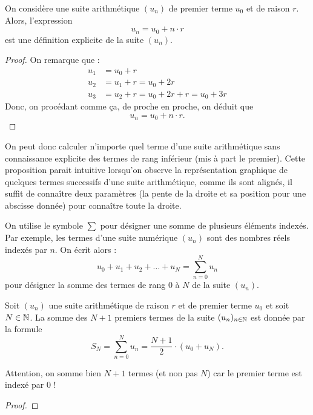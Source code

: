 \documentclass[frenchb]{report}
\begin{document}
\begin{prop}
On considère une suite arithmétique $(u_n)$ de premier terme $u_0$ et de raison $r$. Alors, l'expression 
\[ u_n = u_0 + n \cdot r \]
est une définition explicite de la suite $(u_n)$.
\end{prop}

\begin{proof}
On remarque que :
\begin{align*}
u_1 & = u_0 + r \\
u_2 & = u_1 + r = u_0 + 2r  \\
u_3 & = u_2 + r = u_0 + 2r + r = u_0 + 3r 
\end{align*}
Donc, on procédant comme ça, de proche en proche, on déduit que 
\[ u_n = u_0 + n \cdot r . \]
\end{proof}

\begin{rmq} On peut donc calculer n'importe quel terme d'une suite arithmétique sans connaissance explicite des termes de rang inférieur (mis à part le premier). Cette proposition parait intuitive lorsqu'on observe la représentation graphique de quelques termes successifs d'une suite arithmétique, comme ils sont alignés, il suffit de connaître deux paramètres (la pente de la droite et sa position pour une abscisse donnée) pour connaître toute la droite. 
\end{rmq}

\begin{nota}
On utilise le symbole $\sum$ pour désigner une somme de plusieurs éléments indexés. Par exemple, les termes d'une suite numérique $(u_n)$ sont des nombres réels indexés par $n$. On écrit alors :
\[ u_0 + u_1 + u_2 + \dots + u_N = \sum_{n=0}^N u_n \]
pour désigner la somme des termes de rang 0 à $N$ de la suite $(u_n)$.
\end{nota}

\begin{prop}
Soit $(u_n)$ une suite arithmétique de raison $r$ et de premier terme $u_0$ et soit $N \in \mathbb{N}$. La somme des $N+1$ premiers termes de la suite $(u_n)_{n \in \mathbb{N}}$ est donnée par la formule 
\[ S_N = \sum_{n=0}^N u_n = \frac{N+1}{2} \cdot (u_0 + u_N). \]
\end{prop}

\begin{rmq}
Attention, on somme bien $N+1$ termes (et non pas $N$) car le premier terme est indexé par 0 !
\end{rmq}

\begin{proof}

\end{proof}
\end{document}

